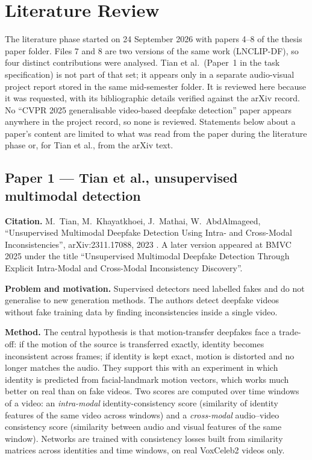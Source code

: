 \documentclass[10pt,a4paper]{article}
\begin{document}
\section{Literature Review}\label{sec:lit}

The literature phase started on 24 September 2026 with papers 4--8 of the thesis paper folder.
Files 7 and 8 are two versions of the same work (LNCLIP-DF), so four distinct contributions were
analysed. Tian et al.\ (Paper~1 in the task specification) is not part of that set; it appears only
in a separate audio-visual project report stored in the same mid-semester folder. It is reviewed
here because it was requested, with its bibliographic details verified against the arXiv record.
No ``CVPR 2025 generalisable video-based deepfake detection'' paper appears anywhere in the project
record, so none is reviewed. Statements below about a paper's content are limited to what was read
from the paper during the literature phase or, for Tian et al., from the arXiv text.

\subsection{Paper 1 --- Tian et al., unsupervised multimodal detection}\label{sec:tian}
\textbf{Citation.} M.~Tian, M.~Khayatkhoei, J.~Mathai, W.~AbdAlmageed, ``Unsupervised Multimodal
Deepfake Detection Using Intra- and Cross-Modal Inconsistencies'', arXiv:2311.17088, 2023
\cite{tian2023unsupervised}. A later version appeared at BMVC 2025 under the title ``Unsupervised
Multimodal Deepfake Detection Through Explicit Intra-Modal and Cross-Modal Inconsistency
Discovery''.

\textbf{Problem and motivation.} Supervised detectors need labelled fakes and do not generalise to
new generation methods. The authors detect deepfake videos without fake training data by finding
inconsistencies inside a single video.

\textbf{Method.} The central hypothesis is that motion-transfer deepfakes face a trade-off: if the
motion of the source is transferred exactly, identity becomes inconsistent across frames; if
identity is kept exact, motion is distorted and no longer matches the audio. They support this with
an experiment in which identity is predicted from facial-landmark motion vectors, which works much
better on real than on fake videos. Two scores are computed over time windows of a video:
an \emph{intra-modal} identity-consistency score (similarity of identity features of the same video
across windows) and a \emph{cross-modal} audio--video consistency score (similarity between audio
and visual features of the same window). Networks are trained with consistency losses built from
similarity matrices across identities and time windows, on real VoxCeleb2 videos only.
\end{document}
